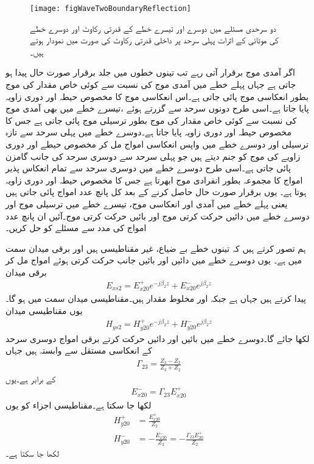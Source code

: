 \begin{figure}
\centering
\texttt{[image: figWaveTwoBoundaryReflection]}
\caption{دو سرحدی  مسئلے میں دوسرے اور تیسرے خطے کے قدرتی رکاوٹ اور دوسرے خطے کی موٹائی کے اثرات پہلی سرحد پر داخلی قدرتی رکاوٹ کی صورت میں نمودار ہوتے ہیں۔}
\label{شکل_مستوی_دو_سرحد_مسئلہ}
\end{figure}

اگر آمدی موج برقرار آتی رہے  تب تینوں خطوں میں جلد برقرار صورت حال پیدا ہو جاتی ہے جہاں پہلے خطے میں آمدی موج کی نسبت سے کوئی خاص مقدار کی موج بطور انعکاسی موج پائی جاتی ہے۔اس انعکاسی موج کا مخصوص حیطہ اور دوری زاویہ پایا جاتا ہے۔اسی طرح دونوں سرحد سے گزرتے ہوئے ،تیسرے خطے میں بھی آمدی موج کی نسبت سے کوئی خاص مقدار کی موج بطور ترسیلی موج پائی جاتی ہے جس کا مخصوص حیطہ اور دوری زاویہ پایا جاتا ہے۔دوسرے خطے میں پہلی سرحد سے تازہ ترسیلی اور دوسرے خطے میں واپس انعکاسی امواج مل کر مخصوص حیطے اور دوری زاویے کی موج کو جنم دیتے ہیں جو پہلی سرحد سے دوسری سرحد کی جانب گامزن پائی جاتی ہے۔اسی طرح دوسرے خطے میں دوسری سرحد سے تمام انعکاس پذیر امواج کا مجموعہ بطور انفرادی موج ابھرتا ہے جس کا مخصوص حیطہ اور دوری زاویہ ہوتا ہے۔ یوں برقرار صورت حال حاصل کرنے کے بعد کل پانچ عدد امواج پائی جاتی ہیں یعنی پہلے خطے میں آمدی اور انعکاسی موج، تیسرے خطے میں ترسیلی موج اور دوسرے خطے میں دائیں حرکت کرتی موج اور بائیں حرکت کرتی موج۔آئیں ان پانچ عدد امواج کی مدد سے مسئلے کو حل کریں۔

ہم تصور کرتے ہیں کہ تینوں خطے بے ضیاع، غیر مقناطیسی ہیں اور برقی میدان  سمت میں ہے۔ یوں دوسرے خطے میں دائیں اور بائیں جانب حرکت کرتی ہوئے امواج مل کر برقی میدان 
\begin{align}
E_{xs2}=E_{x20}^+ e^{-j\beta_2 z}+E_{x20}^- e^{j \beta_2 z}
\end{align}
پیدا کرتے ہیں جہاں  ہے جبکہ  اور  مخلوط مقدار ہیں۔مقناطیسی میدان  سمت میں ہو گا۔یوں مقناطیسی میدان
\begin{align}
H_{ys2}=H_{y20}^+ e^{-j\beta_2 z}+H_{y20}^- e^{j \beta_2 z}
\end{align}
لکھا جائے گا۔دوسرے خطے میں بائیں اور دائیں حرکت کرتے برقی امواج دوسری سرحد کے انعکاسی مستقل  سے وابستہ ہیں جہاں
\begin{align}\label{مساوات_مستوی_دو_سرحد_انعکاسی_مستقل_دو}
\Gamma_{23}=\frac{Z_3-Z_2}{Z_3+Z_2}
\end{align}
کے برابر ہے۔یوں
\begin{align}\label{مساوات_مستوی_دو_سرحد_برقی_دو}
E_{x20}^-=\Gamma_{23} E_{x20}^+
\end{align}
لکھا جا سکتا ہے۔مقناطیسی اجزاء کو یوں 
\begin{align}\label{مساوات_مستوی_دو_سرحد_مقناطیسی_دو}
H_{y20}^+&=\frac{E_{x20}^+}{Z_2}\\
H_{y20}^-&=-\frac{E_{x20}^-}{Z_2}=-\frac{\Gamma_{23} E_{20}^+}{Z_2}
\end{align}
لکھا جا سکتا ہے۔

